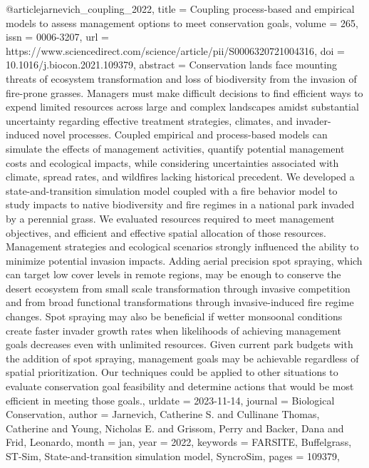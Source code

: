{{@article{jarnevich_coupling_2022,
	title = {Coupling process-based and empirical models to assess management options to meet conservation goals},
	volume = {265},
	issn = {0006-3207},
	url = {https://www.sciencedirect.com/science/article/pii/S0006320721004316},
	doi = {10.1016/j.biocon.2021.109379},
	abstract = {Conservation lands face mounting threats of ecosystem transformation and loss of biodiversity from the invasion of fire-prone grasses. Managers must make difficult decisions to find efficient ways to expend limited resources across large and complex landscapes amidst substantial uncertainty regarding effective treatment strategies, climates, and invader-induced novel processes. Coupled empirical and process-based models can simulate the effects of management activities, quantify potential management costs and ecological impacts, while considering uncertainties associated with climate, spread rates, and wildfires lacking historical precedent. We developed a state-and-transition simulation model coupled with a fire behavior model to study impacts to native biodiversity and fire regimes in a national park invaded by a perennial grass. We evaluated resources required to meet management objectives, and efficient and effective spatial allocation of those resources. Management strategies and ecological scenarios strongly influenced the ability to minimize potential invasion impacts. Adding aerial precision spot spraying, which can target low cover levels in remote regions, may be enough to conserve the desert ecosystem from small scale transformation through invasive competition and from broad functional transformations through invasive-induced fire regime changes. Spot spraying may also be beneficial if wetter monsoonal conditions create faster invader growth rates when likelihoods of achieving management goals decreases even with unlimited resources. Given current park budgets with the addition of spot spraying, management goals may be achievable regardless of spatial prioritization. Our techniques could be applied to other situations to evaluate conservation goal feasibility and determine actions that would be most efficient in meeting those goals.},
	urldate = {2023-11-14},
	journal = {Biological Conservation},
	author = {Jarnevich, Catherine S. and Cullinane Thomas, Catherine and Young, Nicholas E. and Grissom, Perry and Backer, Dana and Frid, Leonardo},
	month = jan,
	year = {2022},
	keywords = {FARSITE, Buffelgrass, ST-Sim, State-and-transition simulation model, SyncroSim},
	pages = {109379},
}

}}
